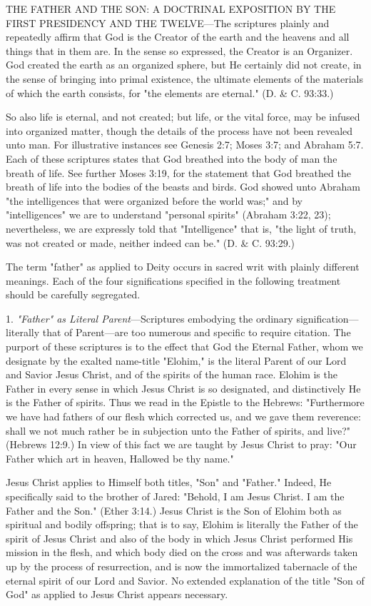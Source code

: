 THE FATHER AND THE SON: A DOCTRINAL EXPOSITION BY THE FIRST
PRESIDENCY AND THE TWELVE—The scriptures plainly and repeatedly affirm that God
is the Creator of the earth and the heavens and all things that in them are. In the sense so
expressed, the Creator is an Organizer. God created the earth as an organized sphere, but He
certainly did not create, in the sense of bringing into primal existence, the ultimate elements
of the materials of which the earth consists, for "the elements are eternal." (D. \& C. 93:33.)

So also life is eternal, and not created; but life, or the vital force, may be infused into
organized matter, though the details of the process have not been revealed unto man. For
illustrative instances see Genesis 2:7; Moses 3:7; and Abraham 5:7. Each of these scriptures
states that God breathed into the body of man the breath of life. See further Moses 3:19, for
the statement that God breathed the breath of life into the bodies of the beasts and birds. God
showed unto Abraham "the intelligences that were organized before the world was;" and by
"intelligences" we are to understand "personal spirits" (Abraham 3:22, 23); nevertheless, we
are expressly told that "Intelligence" that is, "the light of truth, was not created or made,
neither indeed can be." (D. \& C. 93:29.)

The term "father" as applied to Deity occurs in sacred writ with plainly different meanings.
Each of the four significations specified in the following treatment should be carefully
segregated.

1. \textit{"Father" as Literal Parent}—Scriptures embodying the ordinary signification—literally
that of Parent—are too numerous and specific to require citation. The purport of these
scriptures is to the effect that God the Eternal Father, whom we designate by the exalted
name-title "Elohim," is the literal Parent of our Lord and Savior Jesus Christ, and of the
spirits of the human race. Elohim is the Father in every sense in which Jesus Christ is so
designated, and distinctively He is the Father of spirits. Thus we read in the Epistle to the
Hebrews: "Furthermore we have had fathers of our flesh which corrected us, and we gave
them reverence: shall we not much rather be in subjection unto the Father of spirits, and
live?" (Hebrews 12:9.) In view of this fact we are taught by Jesus Christ to pray: "Our Father
which art in heaven, Hallowed be thy name."

Jesus Christ applies to Himself both titles, "Son" and "Father." Indeed, He specifically said to
the brother of Jared: "Behold, I am Jesus Christ. I am the Father and the Son." (Ether 3:14.)
Jesus Christ is the Son of Elohim both as spiritual and bodily offspring; that is to say, Elohim
is literally the Father of the spirit of Jesus Christ and also of the body in which Jesus Christ
performed His mission in the flesh, and which body died on the cross and was afterwards
taken up by the process of resurrection, and is now the immortalized tabernacle of the eternal
spirit of our Lord and Savior. No extended explanation of the title "Son of God" as applied to
Jesus Christ appears necessary.

